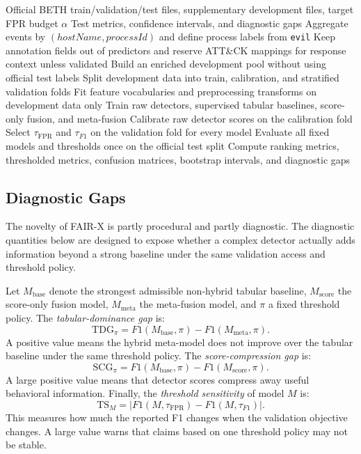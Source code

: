 \documentclass[10pt,journal,compsoc]{IEEEtran}
\begin{document}
\begin{algorithm}[t]
\caption{FAIR-X evaluation protocol instantiated as FAIR-BETH}
\label{alg:fairbeth}
\begin{algorithmic}[1]
\Require Official BETH train/validation/test files, supplementary development files, target FPR budget $\alpha$
\Ensure Test metrics, confidence intervals, and diagnostic gaps
\State Aggregate events by $(hostName, processId)$ and define process labels from \texttt{evil}
\State Keep annotation fields out of predictors and reserve ATT\&CK mappings for response context unless validated
\State Build an enriched development pool without using official test labels
\State Split development data into train, calibration, and stratified validation folds
\State Fit feature vocabularies and preprocessing transforms on development data only
\State Train raw detectors, supervised tabular baselines, score-only fusion, and meta-fusion
\State Calibrate raw detector scores on the calibration fold
\State Select $\tau_{\mathrm{FPR}}$ and $\tau_{F1}$ on the validation fold for every model
\State Evaluate all fixed models and thresholds once on the official test split
\State Compute ranking metrics, thresholded metrics, confusion matrices, bootstrap intervals, and diagnostic gaps
\end{algorithmic}
\end{algorithm}

\subsection{Diagnostic Gaps}

The novelty of FAIR-X is partly procedural and partly diagnostic. The diagnostic quantities below are designed to expose whether a complex detector actually adds information beyond a strong baseline under the same validation access and threshold policy.

Let $M_{\mathrm{base}}$ denote the strongest admissible non-hybrid tabular baseline, $M_{\mathrm{score}}$ the score-only fusion model, $M_{\mathrm{meta}}$ the meta-fusion model, and $\pi$ a fixed threshold policy. The \emph{tabular-dominance gap} is:
\[
\mathrm{TDG}_{\pi}=F1(M_{\mathrm{base}},\pi)-F1(M_{\mathrm{meta}},\pi).
\]
A positive value means the hybrid meta-model does not improve over the tabular baseline under the same threshold policy. The \emph{score-compression gap} is:
\[
\mathrm{SCG}_{\pi}=F1(M_{\mathrm{base}},\pi)-F1(M_{\mathrm{score}},\pi).
\]
A large positive value means that detector scores compress away useful behavioral information. Finally, the \emph{threshold sensitivity} of model $M$ is:
\[
\mathrm{TS}_{M}=|F1(M,\tau_{\mathrm{FPR}})-F1(M,\tau_{F1})|.
\]
This measures how much the reported F1 changes when the validation objective changes. A large value warns that claims based on one threshold policy may not be stable.
\end{document}
